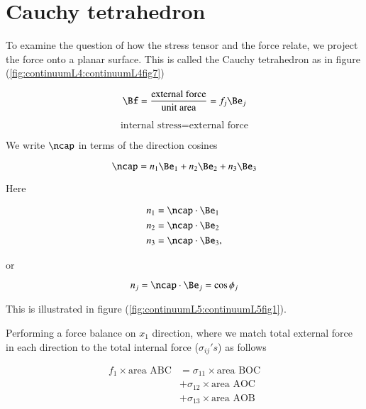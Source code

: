 \section{Cauchy tetrahedron}

To examine the question of how the stress tensor and the force relate, we project the force onto a planar surface.  This is called the Cauchy tetrahedron  as in figure (\ref{fig:continuumL4:continuumL4fig7})


\begin{equation}\label{eqn:continuumL4:150}
\Bf = \frac{\text{external force}}{\text{unit area}} = f_j \Be_j
\end{equation}

\begin{equation}\label{eqn:continuumL4:170}
\text{internal stress} = \text{external force}
\end{equation}

We write $\ncap$ in terms of the direction cosines

\begin{equation}\label{eqn:continuumL4:190}
\ncap = 
n_1 \Be_1 + 
n_2 \Be_2 + 
n_3 \Be_3 
\end{equation}

Here 

\begin{align}\label{eqn:continuumL4:210}
n_1 &= \ncap \cdot \Be_1 \\
n_2 &= \ncap \cdot \Be_2 \\
n_3 &= \ncap \cdot \Be_3,
\end{align}

or 

\begin{equation}\label{eqn:continuumL4:230}
n_j = \ncap \cdot \Be_j = \cos\phi_j
\end{equation}

This is illustrated in figure (\ref{fig:continuumL5:continuumL5fig1}).


Performing a force balance on $x_1$ direction, where we match total external force in each direction to the total internal force ($\sigma_{ij}'s$) as follows

\begin{equation}\label{eqn:continuumL4:250}
\begin{aligned}
f_1 \times \text{area ABC} 
&= 
\sigma_{11} \times \text{area BOC} \\
&+\sigma_{12} \times \text{area AOC} \\
&+\sigma_{13} \times \text{area AOB}
\end{aligned}
\end{equation}

